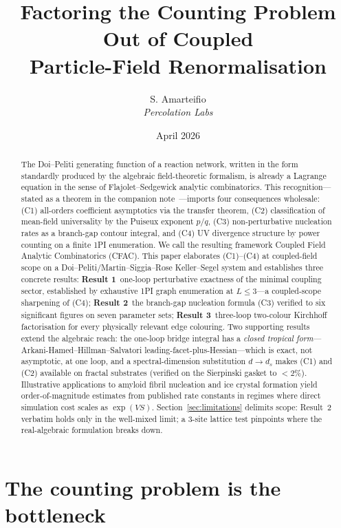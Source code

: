 \documentclass[11pt,a4paper]{article}
\title{Factoring the Counting Problem Out of Coupled\\
  Particle-Field Renormalisation}
\author{S. Amarteifio\\
  \small\textit{Percolation Labs}}
\date{April 2026}
\theoremstyle{plain}
\begin{document}
\maketitle

\begin{abstract}
The Doi--Peliti generating function of a reaction network, written
in the form standardly produced by the algebraic field-theoretic
formalism, is already a Lagrange equation in the sense of
Flajolet--Sedgewick analytic combinatorics.  This recognition---stated
as a theorem in the companion note~\citep{CFACtheorem}---imports
four consequences wholesale: (C1) all-orders coefficient asymptotics
via the transfer theorem, (C2) classification of mean-field
universality by the Puiseux exponent $p/q$, (C3) non-perturbative
nucleation rates as a branch-gap contour integral, and (C4) UV
divergence structure by power counting on a finite 1PI enumeration.
We call the resulting framework Coupled Field Analytic
Combinatorics (CFAC).  This paper elaborates (C1)--(C4) at
coupled-field scope on a Doi--Peliti/Martin--Siggia--Rose
Keller--Segel system and establishes three concrete results:
\textbf{Result 1}~one-loop perturbative exactness of the minimal
coupling sector, established by exhaustive 1PI graph enumeration
at $L \leq 3$---a coupled-scope sharpening of (C4);
\textbf{Result 2}~the branch-gap nucleation formula
(C3) verified to six significant figures on seven parameter sets;
\textbf{Result 3}~three-loop two-colour Kirchhoff factorisation for
every physically relevant edge colouring.  Two supporting results
extend the algebraic reach: the one-loop bridge integral has a
\emph{closed tropical form}---Arkani-Hamed--Hillman--Salvatori
leading-facet-plus-Hessian---which is exact, not asymptotic, at one
loop, and a spectral-dimension substitution $d \to d_s$ makes (C1)
and (C2) available on fractal substrates (verified on the Sierpinski
gasket to $<2\%$).  Illustrative applications to amyloid fibril
nucleation and ice crystal formation yield order-of-magnitude
estimates from published rate constants in regimes where direct
simulation cost scales as $\exp(VS)$.  Section~\ref{sec:limitations}
delimits scope: Result~2 verbatim holds only in the well-mixed
limit; a 3-site lattice test pinpoints where the real-algebraic
formulation breaks down.
\end{abstract}

\section{The counting problem is the bottleneck}
\end{document}

